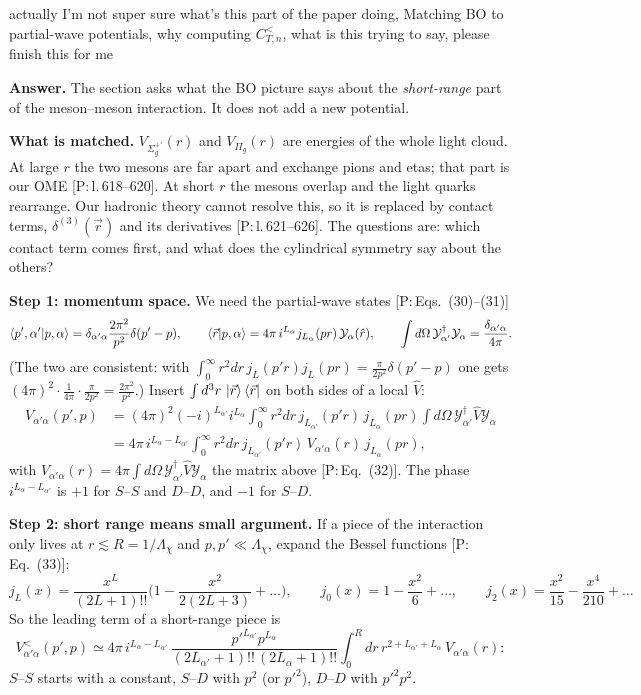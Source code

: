 \documentclass[11pt]{article}
\newcommand{\tagP}[1]{\textcolor{blue!65!black}{\textsf{\small[P:\,#1]}}}
\newenvironment{aiadd}{\par}{\par}
\begin{document}
actually I'm not super sure what's this part of the paper doing, Matching BO to partial-wave potentials, why computing $C_{T,n}^<$, what is this trying to say, please finish this for me

\begin{aiadd}
	\textbf{Answer.} The section asks what the BO picture says about the \emph{short-range} part of the meson--meson interaction. It does not add a new potential.

	\textbf{What is matched.} $V_{\Sigma_g^{+\prime}}(r)$ and $V_{\Pi_g}(r)$ are energies of the whole light cloud. At large $r$ the two mesons are far apart and exchange pions and etas; that part is our OME \tagP{l.\,618--620}. At short $r$ the mesons overlap and the light quarks rearrange. Our hadronic theory cannot resolve this, so it is replaced by contact terms, $\delta^{(3)}(\vec r)$ and its derivatives \tagP{l.\,621--626}. The questions are: which contact term comes first, and what does the cylindrical symmetry say about the others?

	\textbf{Step 1: momentum space.} We need the partial-wave states \tagP{Eqs.~(30)--(31)}
	\[
		\braket{p',\alpha'|p,\alpha}=\delta_{\alpha'\alpha}\frac{2\pi^2}{p^2}\delta(p'-p),\qquad
		\braket{\vec r|p,\alpha}=4\pi\,i^{L_\alpha}j_{L_\alpha}(pr)\,\mathcal Y_\alpha(\hat r),\qquad
		\int d\Omega\,\mathcal Y_{\alpha'}^\dagger\mathcal Y_\alpha=\frac{\delta_{\alpha'\alpha}}{4\pi}.
	\]
	(The two are consistent: with $\int_0^\infty r^2dr\,j_L(p'r)j_L(pr)=\frac{\pi}{2p^2}\delta(p'-p)$ one gets $(4\pi)^2\cdot\frac{1}{4\pi}\cdot\frac{\pi}{2p^2}=\frac{2\pi^2}{p^2}$.) Insert $\int d^3r\,\ket{\vec r}\bra{\vec r}$ on both sides of a local $\hat V$:
	\begin{align*}
		V_{\alpha'\alpha}(p',p) & =(4\pi)^2(-i)^{L_{\alpha'}}i^{L_\alpha}\int_0^\infty r^2dr\,j_{L_{\alpha'}}(p'r)\,j_{L_\alpha}(pr)\int d\Omega\,\mathcal Y_{\alpha'}^\dagger\hat V\mathcal Y_\alpha \\
		                        & =4\pi\,i^{L_\alpha-L_{\alpha'}}\int_0^\infty r^2dr\,j_{L_{\alpha'}}(p'r)\,V_{\alpha'\alpha}(r)\,j_{L_\alpha}(pr),
	\end{align*}
	with $V_{\alpha'\alpha}(r)=4\pi\int d\Omega\,\mathcal Y_{\alpha'}^\dagger\hat V\mathcal Y_\alpha$ the matrix above \tagP{Eq.~(32)}. The phase $i^{L_\alpha-L_{\alpha'}}$ is $+1$ for $S$--$S$ and $D$--$D$, and $-1$ for $S$--$D$.

	\textbf{Step 2: short range means small argument.} If a piece of the interaction only lives at $r\lesssim R=1/\Lambda_\chi$ and $p,p'\ll\Lambda_\chi$, expand the Bessel functions \tagP{Eq.~(33)}:
	\[
		j_L(x)=\frac{x^L}{(2L+1)!!}\Big(1-\frac{x^2}{2(2L+3)}+\dots\Big),\qquad
		j_0(x)=1-\frac{x^2}{6}+\dots,\qquad
		j_2(x)=\frac{x^2}{15}-\frac{x^4}{210}+\dots
	\]
	So the leading term of a short-range piece is
	\[
		V^<_{\alpha'\alpha}(p',p)\simeq4\pi\,i^{L_\alpha-L_{\alpha'}}\,\frac{p'^{L_{\alpha'}}p^{L_\alpha}}{(2L_{\alpha'}+1)!!\,(2L_\alpha+1)!!}\int_0^Rdr\,r^{2+L_{\alpha'}+L_\alpha}\,V_{\alpha'\alpha}(r):
	\]
	$S$--$S$ starts with a constant, $S$--$D$ with $p^2$ (or $p'^2$), $D$--$D$ with $p'^2p^2$.


\end{aiadd}
\end{document}
